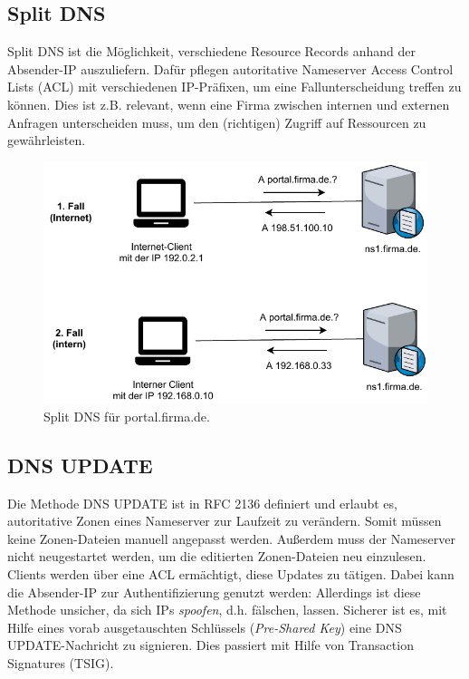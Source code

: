 \subsection{Split DNS}
Split \gls{DNS} ist die Möglichkeit, verschiedene Resource Records anhand der Absender-IP auszuliefern. Dafür pflegen autoritative Nameserver Access Control Lists (\gls{ACL}) mit verschiedenen IP-Präfixen, um eine Fallunterscheidung treffen zu können\cite[S.565-567]{Fall2011}. Dies ist z.B. relevant, wenn eine Firma zwischen internen und externen Anfragen unterscheiden muss, um den (richtigen) Zugriff auf Ressourcen zu gewährleisten.

\begin{figure}[h]
  \centering
  \includegraphics{Figures/dns_split_view.pdf}
  \caption{Split DNS für portal.firma.de.}
  \label{grafik: split-dns}
\end{figure}\FloatBarrier

\subsection{DNS UPDATE}
Die Methode \gls{DNS} UPDATE ist in \gls{RFC} 2136 definiert und erlaubt es, autoritative Zonen eines Nameserver zur Laufzeit zu verändern\cite{rfc2136}. Somit müssen keine Zonen-Dateien manuell angepasst werden. Außerdem muss der Nameserver nicht neugestartet werden, um die editierten Zonen-Dateien neu einzulesen.\\
\gls{Client}s werden über eine \gls{ACL} ermächtigt, diese Updates zu tätigen. Dabei kann die Absender-IP zur Authentifizierung genutzt werden: Allerdings ist diese Methode unsicher, da sich IPs \textit{spoofen}, d.h. fälschen, lassen\cite[S.70-71]{Fall2011}. Sicherer ist es, mit Hilfe eines vorab ausgetauschten Schlüssels (\textit{Pre-Shared Key}) eine \gls{DNS} UPDATE-Nachricht zu signieren. Dies passiert mit Hilfe von Transaction Signatures (\gls{TSIG})\cite[S.911-914]{Fall2011}.

